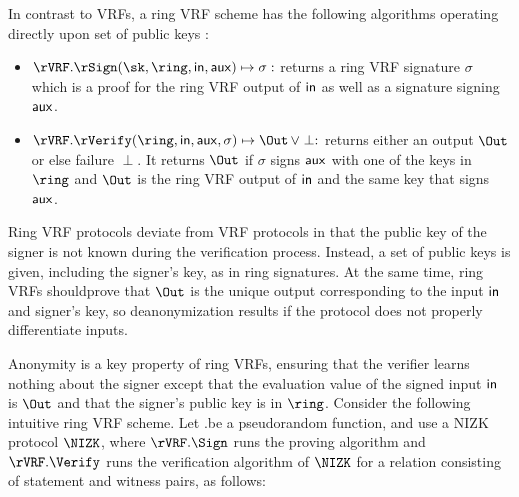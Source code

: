 In contrast to VRFs, a ring VRF scheme has the following algorithms operating directly upon
 set of public keys \ring:
\begin{itemize}
\item $\rVRF.\rSign(\sk,\ring,\msg, \aux) \mapsto \sigma:$
    returns a ring VRF signature $\sigma$ which is a proof for the ring VRF output of $ \mathsf{in} $ as well as a signature signing $ \mathsf{aux} $.
\item $\rVRF.\rVerify(\ring,\msg,\aux,\sigma) \mapsto \Out \, \lor \perp:$
    returns either an output $\Out$ or else failure $\perp$. It returns $ \Out $ if $ \sigma  $ signs $ \mathsf{aux} $ with one of the keys in $ \ring $ and $ \Out $ is the ring VRF output of $ \mathsf{in} $ and the same key that signs $ \mathsf{aux} $.
\end{itemize}


Ring VRF protocols deviate from VRF protocols in that the public key of the
signer is not known during the verification process.
Instead, a set of public keys is given, including the signer's key, as in ring signatures.
At the same time, ring VRFs shouldprove that $\Out$ is the unique output
corresponding to the input $ \mathsf{in} $ and signer's key, 
so deanonymization results if the protocol does not properly differentiate inputs.

Anonymity is a key property of ring VRFs, ensuring that the verifier learns nothing about the signer except that the  evaluation value of the signed input $ \mathsf{in} $ is $ \Out $ and that the signer's public key is in $ \ring $.
Consider the following intuitive ring VRF scheme.
Let \rVRF.\Eval be a pseudorandom function, and use a NIZK protocol $ \NIZK $, where $ \rVRF.\Sign $ runs the proving algorithm and $ \rVRF.\Verify $ runs the verification algorithm of $ \NIZK $ for a relation consisting of statement and witness pairs, as follows:



